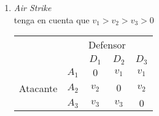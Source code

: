\documentclass[11pt]{article}
\begin{document}
\begin{flushleft}
\begin{flushleft}
\begin{enumerate}[label=\roman*)]
\begin{center}
\begin{tabular}{cc|c|c|c|}
                & \multicolumn{1}{c}{} & \multicolumn{1}{c}{$B_1$}  & \multicolumn{1}{c}{$B_2$} & \multicolumn{1}{c}{$B_3$} \\\cline{3-5}
                & $A_1$ & $8$ & $-3$ & $10$ \\\cline{3-5}
                {J $1$} & $A_2$ & $-7$ & $-10$ & $-8$ \\\cline{3-5}
                & $A_3$ & $10$ & $-9$ & $9$ \\\cline{3-5}
            \end{tabular}
        \end{center}
        \item \textit{Air Strike}\\
        tenga en cuenta que $v_1>v_2>v_3>0$
        \begin{center}    
            \setlength{\extrarowheight}{0pt}
            \begin{tabular}{cc|c|c|c|}
                & \multicolumn{1}{c}{} & \multicolumn{2}{c}{Defensor}\\
                & \multicolumn{1}{c}{} & \multicolumn{1}{c}{$D_1$}  & \multicolumn{1}{c}{$D_2$} & \multicolumn{1}{c}{$D_3$} \\\cline{3-5}
                & $A_1$ & $0$ & $v_1$ & $v_1$ \\\cline{3-5}
                {Atacante} & $A_2$ & $v_2$ & $0$ & $v_2$ \\\cline{3-5}
                & $A_3$ & $v_3$ & $v_3$ & $0$ \\\cline{3-5}
            \end{tabular}
    \end{center}
    \end{enumerate}
\end{flushleft}


\end{flushleft}
\end{document}
